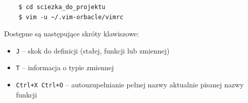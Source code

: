 \documentclass[shortabstract,mgr]{iithesis}
\begin{document}
\begin{appendices}
\begin{lstlisting}
    $ cd sciezka_do_projektu
    $ vim -u ~/.vim-orbacle/vimrc
\end{lstlisting}

Dostępne są następujące skróty klawiszowe:

\begin{itemize}
\item \texttt{J} -- skok do definicji (stałej, funkcji lub zmiennej)
\item \texttt{T} -- informacja o typie zmiennej
\item \texttt{Ctrl+X Ctrl+O} -- autouzupełnianie pełnej nazwy aktualnie pisanej nazwy funkcji
\end{itemize}












\end{appendices}


\printbibliography







\end{document}

